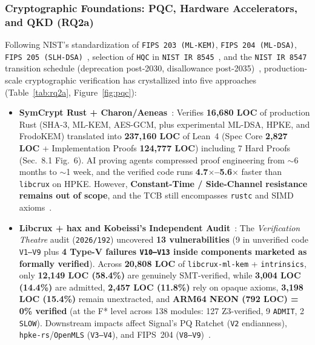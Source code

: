\documentclass[10pt,twocolumn]{article}
\begin{document}
\subsubsection{Cryptographic Foundations: PQC, Hardware Accelerators, and QKD (RQ2a)}
\label{sec:rq2a}

Following NIST's standardization of \texttt{FIPS 203 (ML-KEM)}, \texttt{FIPS 204 (ML-DSA)}, \texttt{FIPS 205 (SLH-DSA)}~\cite{nist2024fips203,nist2024fips204,nist2024fips205}, selection of \texttt{HQC} in \texttt{NIST IR 8545}~\cite{alagic2025nistir8545}, and the \texttt{NIST IR 8547} transition schedule (deprecation post-2030, disallowance post-2035)~\cite{moody2026nistir8547}, production-scale cryptographic verification has crystallized into five approaches (Table~\ref{tab:rq2a}, Figure~\ref{fig:pqc}):

\begin{itemize}
  \item \textbf{SymCrypt Rust + Charon/Aeneas}~\cite{ho2022aeneas,ho2026symcrypt}: Verifies \textbf{16,680 LOC} of production Rust (SHA-3, ML-KEM, AES-GCM, plus experimental ML-DSA, HPKE, and FrodoKEM) translated into \textbf{237,160 LOC} of Lean~4 (Spec Core \textbf{2,827 LOC} + Implementation Proofs \textbf{124,777 LOC}) including 7 Hard Proofs (Sec.~8.1 Fig.~6). AI proving agents compressed proof engineering from $\sim$6 months to $\sim$1 week, and the verified code runs \textbf{4.7$\times$--5.6$\times$} faster than \texttt{libcrux} on HPKE. However, \textbf{Constant-Time / Side-Channel resistance remains out of scope}, and the TCB still encompasses \texttt{rustc} and SIMD axioms~\cite{ho2026symcrypt}.
  \item \textbf{Libcrux + hax and Kobeissi's Independent Audit}~\cite{bhargavan2025hax,kobeissi2026theatre}: The \emph{Verification Theatre} audit (\texttt{2026/192}) uncovered \textbf{13 vulnerabilities} (9 in unverified code \texttt{V1--V9} plus \textbf{4 Type-V failures \texttt{V10--V13} inside components marketed as formally verified}). Across \textbf{20,808 LOC} of \texttt{libcrux-ml-kem} + \texttt{intrinsics}, only \textbf{12,149 LOC (58.4\%)} are genuinely SMT-verified, while \textbf{3,004 LOC (14.4\%)} are admitted, \textbf{2,457 LOC (11.8\%)} rely on opaque axioms, \textbf{3,198 LOC (15.4\%)} remain unextracted, and \textbf{ARM64 NEON (792 LOC) = 0\% verified} (at the F* level across 138 modules: 127 Z3-verified, 9 \texttt{ADMIT}, 2 \texttt{SLOW}). Downstream impacts affect Signal's PQ Ratchet (\texttt{V2} endianness), \texttt{hpke-rs}/\texttt{OpenMLS} (\texttt{V3--V4}), and FIPS~204 (\texttt{V8--V9})~\cite{kobeissi2026theatre}.

\end{itemize}
\end{document}
